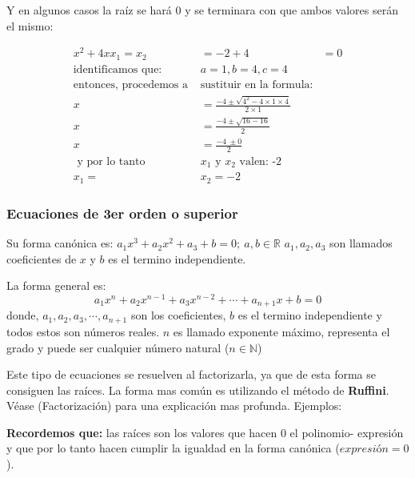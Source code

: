     Y en algunos casos la raíz se hará 0 y se terminara con que ambos valores
    serán el mismo:

    \begin{align*}
        x^2 +4x x_1=x_2&=-2+4 &= 0		\\
        \text{identificamos que: }& a=1,b=4,c=4\\
        \text{entonces, procedemos a }&\text{sustituir en la formula:}\\
        x &= \frac{-4\pm \sqrt{4^2-4\times1\times4}}{2\times1}\\
        x &= \frac{-4 \pm \sqrt{ 16 - 16}}{2} \\
        x &= \frac{-4\ \pm 0}{2}\\
        \text{ y por lo tanto }&\text{$x_1$ y $x_2$ valen: -2}\\
        x_1=&x_2=-2
    \end{align*}




    \subsubsection*{Ecuaciones de 3er orden o superior} \label{Ecuaciones-de-3er-orden-o-superior}
    Su forma canónica es: $a_1x^3+a_2x^2+a_3+b=0;\ a,b\in\mathbb{R}$ $a_1,a_2,a_3$ son
    llamados coeficientes  de $x$ y $b$ es el termino independiente.

    La forma general es:
    $$a_1x^n+a_2x^{n-1}+a_3x^{n-2}+\cdots+a_{n+1}x+b = 0$$
    donde, $a_1,a_2,a_3,\cdots,a_{n+1}$ son los coeficientes, $b$ es el termino
    independiente y todos estos son números reales. $n$ es llamado exponente máximo,
    representa el grado y puede ser cualquier número natural ($n \in \mathbb{N}$)


    Este tipo de ecuaciones se resuelven al factorizarla, ya que de esta forma
    se consiguen las raíces. La forma mas común es utilizando el método
    de \textbf{Ruffini}. Véase (\refname{Factorización}) para una explicación
    mas profunda.
    Ejemplos:

    \textbf{Recordemos que:} las raíces son los valores que hacen 0 el polinomio-
    expresión y que por lo tanto hacen cumplir la igualdad en la forma canónica
    ($expresión=0$).

